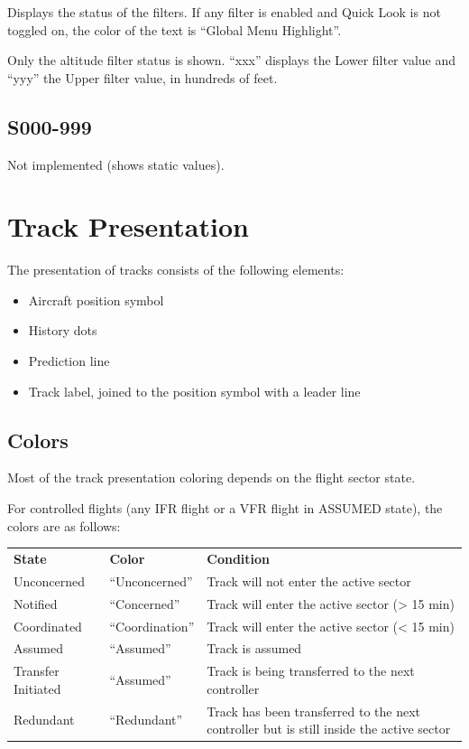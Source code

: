 \documentclass[11pt,a4paper]{memoir}
\begin{document}
Displays the status of the filters. If any filter is enabled and Quick Look is not toggled on, the color of the
text is “Global Menu Highlight”.

Only the altitude filter status is shown. “xxx” displays the Lower filter value and “yyy” the Upper filter
value, in hundreds of feet.

\subsection{S000-999}
Not implemented (shows static values).

\section{Track Presentation}

The presentation of tracks consists of the following elements:

\begin{itemize}
    \item{Aircraft position symbol}
    \item{History dots}
    \item{Prediction line}
    \item{Track label, joined to the position symbol with a leader line}
\end{itemize}

\subsection{Colors}

Most of the track presentation coloring depends on the flight sector state.

For controlled flights (any IFR flight or a VFR flight in ASSUMED state), the colors are as follows:\\

\begin{tabular}{l l l}
\textbf{State}          & \textbf{Color}    & \textbf{Condition}
\\Unconcerned           & “Unconcerned”     & Track will not enter the active sector
\\Notified              & “Concerned”       & Track will enter the active sector (> 15 min)
\\Coordinated           & “Coordination”    & Track will enter the active sector (< 15 min)
\\Assumed               & “Assumed”         & Track is assumed
\\Transfer Initiated    & “Assumed”         & Track is being transferred to the next controller
\\Redundant             & “Redundant”       & Track has been transferred to the next controller but is still inside the active sector
\end{tabular}
\end{document}
